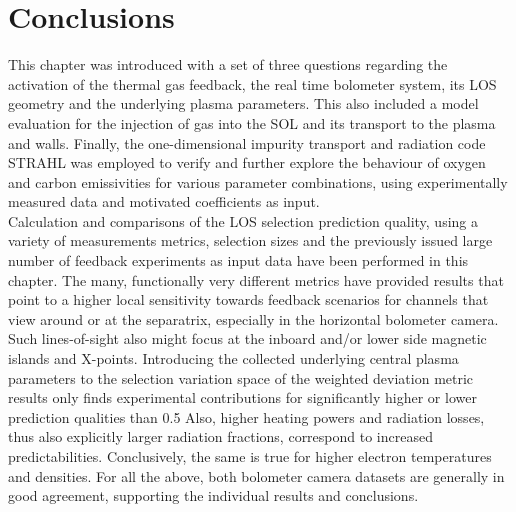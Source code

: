     \section{Conclusions}\label{sec:conclusionschap3}%
%
        This chapter was introduced with a set of three questions regarding the activation of the thermal gas feedback, the real time bolometer system, its LOS geometry and the underlying plasma parameters. This also included a model evaluation for the injection of gas into the SOL and its transport to the plasma and walls. Finally, the one-dimensional impurity transport and radiation code STRAHL was employed to verify and further explore the behaviour of oxygen and carbon emissivities for various parameter combinations, using experimentally measured data and motivated coefficients as input.\\%
        Calculation and comparisons of the LOS selection prediction quality, using a variety of measurements metrics, selection sizes and the previously issued large number of feedback experiments as input data have been performed in this chapter. The many, functionally very different metrics have provided results that point to a higher local sensitivity towards feedback scenarios for channels that view around or at the separatrix, especially in the horizontal bolometer camera. Such lines-of-sight also might focus at the inboard and/or lower side magnetic islands and X-points. Introducing the collected underlying central plasma parameters to the selection variation space of the weighted deviation metric results only finds experimental contributions for significantly higher or lower prediction qualities than \SI{0.5}{\arbitraryunit} Also, higher heating powers and radiation losses, thus also explicitly larger radiation fractions, correspond to increased predictabilities. Conclusively, the same is true for higher electron temperatures and densities. For all the above, both bolometer camera datasets are generally in good agreement, supporting the individual results and conclusions.\\%
